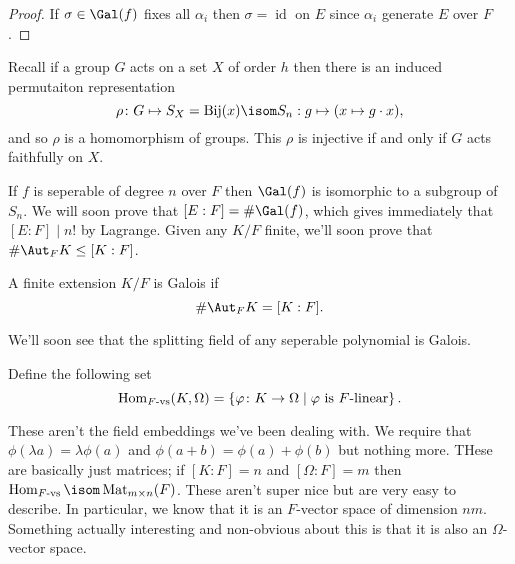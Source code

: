 \begin{proof}
If $\sigma \in \Gal(f)$ fixes all $\alpha_i$ then $\sigma = \operatorname{id}$ on $E$ since $\alpha_i$ generate $E$ over $F$.
\end{proof}

Recall if a group $G$ acts on a set $X$ of order $h$ then there is an induced permutaiton representation 
\[ \rho\colon G \mapsto S_X = \operatorname{Bij}(x) \isom S_n : g \mapsto (x \mapsto g \cdot x), \]
and so $\rho$ is a homomorphism of groups. This $\rho$ is injective if and only if $G$ acts faithfully on $X$.

\begin{corollary}
If $f$ is seperable of degree $n$ over $F$ then $\Gal(f)$ is isomorphic to a subgroup of $S_n$. We will soon prove that $[E : F] = \#\Gal(f)$, which gives immediately that $[E:F] \mid n!$ by Lagrange. Given any $K/F$ finite, we'll soon prove that $\#\Aut_FK \leq [K : F]$.
\end{corollary}

\begin{definition}
A finite extension $K/F$ is Galois if \[\#\Aut_F K = [K : F].\]
\end{definition}

We'll soon see that the splitting field of any seperable polynomial is Galois.

\begin{definition}
Define the following set
\[  \operatorname{Hom}_{F\text{-vs}}(K, \Omega) = \left\{ \varphi\colon K \to \Omega \mid \text{$\varphi$ is $F$-linear} \right\}. \]
\end{definition}
These aren't the field embeddings we've been dealing with. We require that $\phi(\lambda a) = \lambda\phi(a)$ and $\phi(a+b) = \phi(a) + \phi(b)$ but nothing more. THese are basically just matrices; if $[K:F] = n$ and $[\Omega:F] = m$ then $\Hom_{F\text{-vs}}\isom \operatorname{Mat}_{m\times n}(F)$. These aren't super nice but are very easy to describe. In particular, we know that it is an $F$-vector space of dimension $nm$. Something actually interesting and non-obvious about this is that it is also an $\Omega$-vector space.